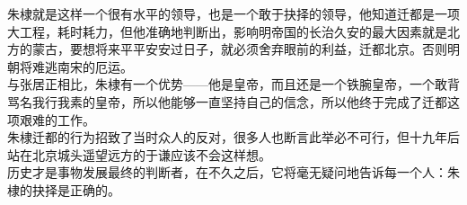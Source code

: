 \begin{multicols}{\theparacolNo}
朱棣就是这样一个很有水平的领导，也是一个敢于抉择的领导，他知道迁都是一项大工程，耗时耗力，但他准确地判断出，影响明帝国的长治久安的最大因素就是北方的蒙古，要想将来平平安安过日子，就必须舍弃眼前的利益，迁都北京。否则明朝将难逃南宋的厄运。\\

与张居正相比，朱棣有一个优势——他是皇帝，而且还是一个铁腕皇帝，一个敢背骂名我行我素的皇帝，所以他能够一直坚持自己的信念，所以他终于完成了迁都这项艰难的工作。\\

朱棣迁都的行为招致了当时众人的反对，很多人也断言此举必不可行，但十九年后站在北京城头遥望远方的于谦应该不会这样想。\\

历史才是事物发展最终的判断者，在不久之后，它将毫无疑问地告诉每一个人：朱棣的抉择是正确的。\\
\ifnum{}
	\end{multicols}
\fi
\newpage
